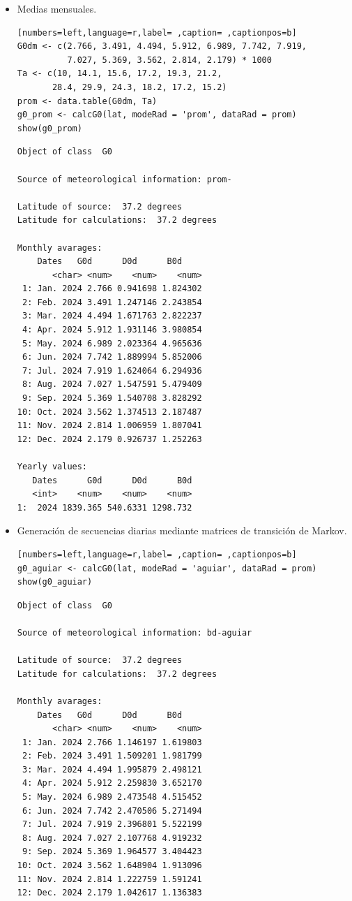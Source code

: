 \begin{itemize}
\item Medias mensuales.
\begin{lstlisting}[numbers=left,language=r,label= ,caption= ,captionpos=b]
G0dm <- c(2.766, 3.491, 4.494, 5.912, 6.989, 7.742, 7.919,
          7.027, 5.369, 3.562, 2.814, 2.179) * 1000
Ta <- c(10, 14.1, 15.6, 17.2, 19.3, 21.2,
       28.4, 29.9, 24.3, 18.2, 17.2, 15.2)
prom <- data.table(G0dm, Ta) 
g0_prom <- calcG0(lat, modeRad = 'prom', dataRad = prom)
show(g0_prom)
\end{lstlisting}

\begin{verbatim}
Object of class  G0 

Source of meteorological information: prom- 

Latitude of source:  37.2 degrees
Latitude for calculations:  37.2 degrees

Monthly avarages:
	Dates   G0d      D0d      B0d
       <char> <num>    <num>    <num>
 1: Jan. 2024 2.766 0.941698 1.824302
 2: Feb. 2024 3.491 1.247146 2.243854
 3: Mar. 2024 4.494 1.671763 2.822237
 4: Apr. 2024 5.912 1.931146 3.980854
 5: May. 2024 6.989 2.023364 4.965636
 6: Jun. 2024 7.742 1.889994 5.852006
 7: Jul. 2024 7.919 1.624064 6.294936
 8: Aug. 2024 7.027 1.547591 5.479409
 9: Sep. 2024 5.369 1.540708 3.828292
10: Oct. 2024 3.562 1.374513 2.187487
11: Nov. 2024 2.814 1.006959 1.807041
12: Dec. 2024 2.179 0.926737 1.252263

Yearly values:
   Dates      G0d      D0d      B0d
   <int>    <num>    <num>    <num>
1:  2024 1839.365 540.6331 1298.732
\end{verbatim}

\item Generación de secuencias diarias mediante matrices de transición de Markov.
\begin{lstlisting}[numbers=left,language=r,label= ,caption= ,captionpos=b]
g0_aguiar <- calcG0(lat, modeRad = 'aguiar', dataRad = prom)
show(g0_aguiar)
\end{lstlisting}

\begin{verbatim}
Object of class  G0 

Source of meteorological information: bd-aguiar 

Latitude of source:  37.2 degrees
Latitude for calculations:  37.2 degrees

Monthly avarages:
	Dates   G0d      D0d      B0d
       <char> <num>    <num>    <num>
 1: Jan. 2024 2.766 1.146197 1.619803
 2: Feb. 2024 3.491 1.509201 1.981799
 3: Mar. 2024 4.494 1.995879 2.498121
 4: Apr. 2024 5.912 2.259830 3.652170
 5: May. 2024 6.989 2.473548 4.515452
 6: Jun. 2024 7.742 2.470506 5.271494
 7: Jul. 2024 7.919 2.396801 5.522199
 8: Aug. 2024 7.027 2.107768 4.919232
 9: Sep. 2024 5.369 1.964577 3.404423
10: Oct. 2024 3.562 1.648904 1.913096
11: Nov. 2024 2.814 1.222759 1.591241
12: Dec. 2024 2.179 1.042617 1.136383


\end{verbatim}
\end{itemize}
